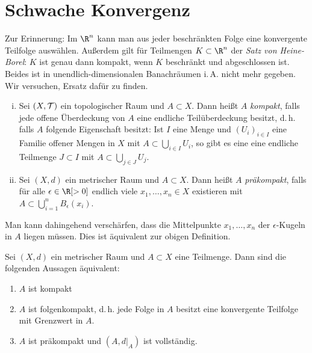 \chapter{Schwache Konvergenz}
Zur Erinnerung: Im $\R^n$ kann man aus jeder beschränkten Folge eine konvergente
Teilfolge auswählen. Außerdem gilt für Teilmengen $K\subset\R^n$ der
\emph{Satz von Heine-Borel}: $K$ ist genau dann kompakt, wenn $K$ beschränkt und
abgeschlossen ist. Beides ist in unendlich-dimensionalen Banachräumen i.\,A.
nicht mehr gegeben. Wir versuchen, Ersatz dafür zu finden.

\begin{thDef} \label{vl15:def:7.1}
    \begin{enumerate}[(i)]
        \item
            Sei $(X,\operatorname{\mathcal{T}})$ ein topologischer Raum und $A\subset X$.
            Dann heißt $A$ \emph{kompakt}, falls jede offene Überdeckung von
            $A$ eine endliche Teilüberdeckung besitzt, d.\,h. falls $A$ folgende
            Eigenschaft besitzt:
            Ist $I$ eine Menge und $(U_i)_{i\in I}$ eine Familie offener Mengen
            in $X$ mit $A\subset \bigcup_{i\in I} U_i$, so gibt es eine eine
            endliche Teilmenge $J\subset I$ mit $A\subset \bigcup_{j\in J} U_j$.
            
        \item \label{vl15:def:7.1:ii}
            Sei $(X,d)$ ein metrischer Raum und $A\subset X$. Dann heißt $A$
            \emph{präkompakt}, falls für alle $\epsilon\in\R[>0]$ endlich viele
            $x_1,\dots,x_n\in X$ existieren mit $A\subset\bigcup_{i=1}^n
            B_\epsilon(x_i)$.
    \end{enumerate}
\end{thDef}

\nnBemerkung
Man kann  dahingehend verschärfen, dass die Mittelpunkte
$x_1,\dots,x_n$ der $\epsilon$-Kugeln in $A$ liegen müssen. Dies ist äquivalent
zur obigen Definition.

\begin{thSatz} \label{vl15:satz7.2}
    Sei $(X,d)$ ein metrischer Raum und $A\subset X$ eine Teilmenge. Dann sind
    die folgenden Aussagen äquivalent:
    \begin{enumerate}[(1)]
        \item \label{vl15:satz7.2:1}
            $A$ ist kompakt
        
        \item \label{vl15:satz7.2:2}
            $A$ ist folgenkompakt, d.\,h. jede Folge in $A$ besitzt eine
            konvergente Teilfolge mit Grenzwert in $A$.
            
        \item \label{vl15:satz7.2:3}
            $A$ ist präkompakt und $(A,d\vert_A)$ ist vollständig.
    \end{enumerate}
\end{thSatz}

